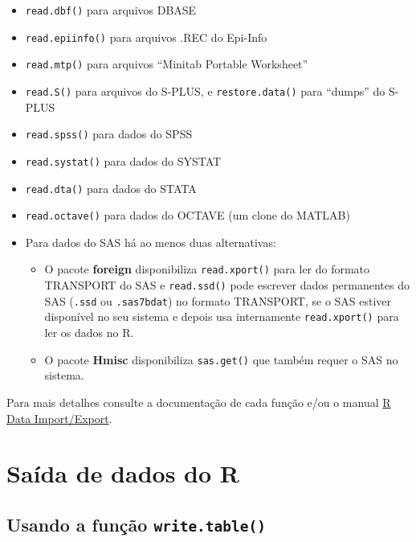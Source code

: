 \documentclass[10pt,a4paper]{book}
\providecommand{\tightlist}{%
  \setlength{\itemsep}{0pt}\setlength{\parskip}{0pt}}
\begin{document}
\begin{itemize}
\tightlist
\item
  \texttt{read.dbf()} para arquivos DBASE
\item
  \texttt{read.epiinfo()} para arquivos .REC do Epi-Info
\item
  \texttt{read.mtp()} para arquivos ``Minitab Portable Worksheet''
\item
  \texttt{read.S()} para arquivos do S-PLUS, e \texttt{restore.data()}
  para ``dumps'' do S-PLUS
\item
  \texttt{read.spss()} para dados do SPSS
\item
  \texttt{read.systat()} para dados do SYSTAT
\item
  \texttt{read.dta()} para dados do STATA
\item
  \texttt{read.octave()} para dados do OCTAVE (um clone do MATLAB)
\item
  Para dados do SAS há ao menos duas alternativas:

  \begin{itemize}
  \tightlist
  \item
    O pacote \textbf{foreign} disponibiliza \texttt{read.xport()} para
    ler do formato TRANSPORT do SAS e \texttt{read.ssd()} pode escrever
    dados permanentes do SAS (\texttt{.ssd} ou \texttt{.sas7bdat}) no
    formato TRANSPORT, se o SAS estiver disponível no seu sistema e
    depois usa internamente \texttt{read.xport()} para ler os dados no
    R.
  \item
    O pacote \textbf{Hmisc} disponibiliza \texttt{sas.get()} que também
    requer o SAS no sistema.
  \end{itemize}
\end{itemize}

Para mais detalhes consulte a documentação de cada função e/ou o manual
\href{http://cran-r.c3sl.ufpr.br/doc/manuals/r-release/R-data.html}{R
Data Import/Export}.

\section{Saída de dados do R}\label{saida-de-dados-do-r}

\subsection{\texorpdfstring{Usando a função
\texttt{write.table()}}{Usando a função write.table()}}\label{usando-a-funcao-write.table}
\end{document}
